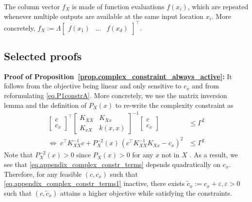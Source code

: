 The column vector $f_X$ is made of function evaluations $f(x_i)$, which are repeated whenever multiple outputs are available at the same input location $x_i$. More concretely, $f_X := \Lambda \begin{bmatrix} f(x_1) & \dots & f(x_d) \end{bmatrix}^\top$.

\subsection{Selected proofs}
\label{sec.selected_derivations}

\begin{my_proof}
	\textbf{Proof of Proposition~\ref{prop.complex_constraint_always_active}:}
	It follows from the objective being linear and only sensitive to $c_x$ and from reformulating \eqref{eq.P1constrA}. More concretely, we use the matrix inversion lemma and the definition of $P_X(x)$ to re-write the complexity constraint as
	\begin{subequations}
		\begin{align}
			\begin{bmatrix}
				c \\
				c_x
			\end{bmatrix}^\top 
			\begin{bmatrix}
				K_{XX} & K_{Xx} \\
				K_{xX } & k(x,x)
			\end{bmatrix}^{-1} 
			\begin{bmatrix}
				c \\
				c_x
			\end{bmatrix} & \leq \Gamma^2 
		   \label{eq.appendix_complex_constr_terms1}
		   \\
			\Leftrightarrow \;
			c^\top K^{-1}_{XX} c
			+
			P_{X}^{-2}(x) \, \left( c^\top K_{XX}^{-1} K_{Xx} - c_x \right)^2 
			&\leq \Gamma^2 
			\label{eq.appendix_complex_constr_terms}
		\end{align}
	\end{subequations}
	Note that $P_X^{-2}(x) > 0$ since $P_X(x) > 0$ for any $x$ not in $X$ \citep{karvonen2022error}. As a result, we see that \eqref{eq.appendix_complex_constr_terms} depends quadratically on $c_x$. Therefore, for any feasible $(c, c_x)$ such that \eqref{eq.appendix_complex_constr_terms1} inactive, there exists $ \tilde c_x := c_x + \varepsilon, \varepsilon > 0$ such that $(c,\tilde c_x)$ attains a higher objective while satisfying the constraints.
\end{my_proof}

